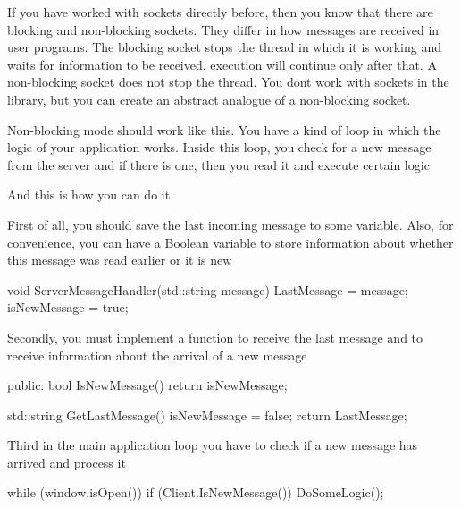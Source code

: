 If you have worked with sockets directly before, then you know that there are blocking and non-\/blocking sockets. They differ in how messages are received in user programs. The blocking socket stops the thread in which it is working and waits for information to be received, execution will continue only after that. A non-\/blocking socket does not stop the thread. You don\textquotesingle{}t work with sockets in the library, but you can create an abstract analogue of a non-\/blocking socket. ~\newline


Non-\/blocking mode should work like this. You have a kind of loop in which the logic of your application works. Inside this loop, you check for a new message from the server and if there is one, then you read it and execute certain logic ~\newline


And this is how you can do it ~\newline


First of all, you should save the last incoming message to some variable. Also, for convenience, you can have a Boolean variable to store information about whether this message was read earlier or it is new ~\newline
 \begin{DoxyVerb}void ServerMessageHandler(std::string message)
{
    LastMessage = message;
    isNewMessage = true;
}
\end{DoxyVerb}


Secondly, you must implement a function to receive the last message and to receive information about the arrival of a new message ~\newline
 \begin{DoxyVerb}public:
    bool IsNewMessage()
    {
        return isNewMessage;
    }

    std::string GetLastMessage()
    {
        isNewMessage = false;
        return LastMessage;
    }
\end{DoxyVerb}


Third in the main application loop you have to check if a new message has arrived and process it ~\newline
 \begin{DoxyVerb}while (window.isOpen())
{
    if (Client.IsNewMessage())
    {
        DoSomeLogic();
    }
}
\end{DoxyVerb}
 